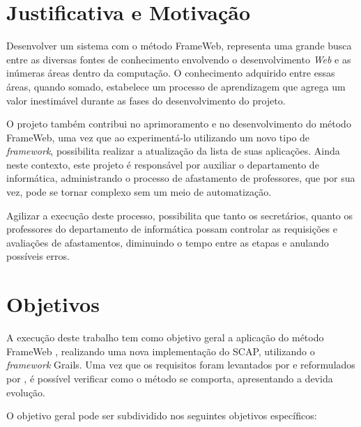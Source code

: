 

\section{Justificativa e Motivação}
\label{sec-intro-justificativa-motivacao}

Desenvolver um sistema com o método FrameWeb, representa uma grande busca entre as diversas fontes de conhecimento envolvendo o desenvolvimento \textit{Web} e as inúmeras áreas dentro da computação. O conhecimento adquirido entre essas áreas, quando somado, estabelece um processo de aprendizagem que agrega um valor inestimável durante as fases do desenvolvimento do projeto.

O projeto também contribui no aprimoramento e no desenvolvimento do método FrameWeb, uma vez que ao experimentá-lo utilizando um novo tipo de \textit{framework}, possibilita realizar a atualização da lista de suas aplicações. Ainda neste contexto, este projeto é responsável por auxiliar o departamento de informática, administrando o processo de afastamento de professores, que por sua vez, pode se tornar complexo sem um meio de automatização.

Agilizar a execução deste processo, possibilita que tanto os secretários, quanto os professores do departamento de informática possam controlar as requisições e avaliações de afastamentos, diminuindo o tempo entre as etapas e anulando possíveis erros.               



\section{Objetivos}
\label{sec-intro-objetivos}

A execução deste trabalho tem como objetivo geral a aplicação do método FrameWeb \cite{souza:masterthesis07}, realizando uma nova implementação do SCAP, utilizando o \textit{framework} Grails. Uma vez que os requisitos foram levantados por  e reformulados por , é possível verificar como o método se comporta, apresentando a devida evolução.

O objetivo geral pode ser subdividido nos seguintes objetivos específicos:

